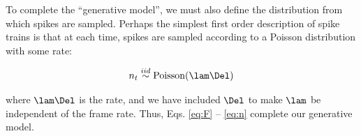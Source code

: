 To complete the ``generative model'', we must also define the distribution from which spikes are sampled.  Perhaps the simplest first order description of spike trains is that at each time, spikes are sampled according to a Poisson distribution with some rate:

\begin{align} \label{eq:n}
	n_t \overset{iid}{\sim} \text{Poisson}(\lam \Del)
\end{align}

\noindent where $\lam \Del$ is the rate, and we have included $\Del$ to make $\lam$ be independent of the frame rate.  Thus, Eqs. \eqref{eq:F} -- \eqref{eq:n} complete our generative model.  











